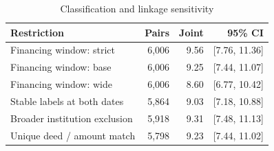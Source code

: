 \begin{table}[htbp]
\centering\small\singlespacing
\caption{Classification and linkage sensitivity}\label{tab:sensitivity}
\begin{tabular}{lrrr}
\toprule
Restriction & Pairs & Joint & 95\% CI \\
\midrule
Financing window: strict & 6,006 & 9.56 & [7.76, 11.36] \\
Financing window: base & 6,006 & 9.25 & [7.44, 11.07] \\
Financing window: wide & 6,006 & 8.60 & [6.77, 10.42] \\
Stable labels at both dates & 5,864 & 9.03 & [7.18, 10.88] \\
Broader institution exclusion & 5,918 & 9.31 & [7.48, 11.13] \\
Unique deed / amount match & 5,798 & 9.23 & [7.44, 11.02] \\
\bottomrule
\end{tabular}
\end{table}

